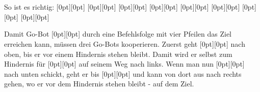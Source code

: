 {{\section*{\BrochureSolution}
So ist es richtig:
\raisebox{-0.5ex}[0pt][0pt]{} \raisebox{-0.5ex}[0pt][0pt]{}  \raisebox{-0.5ex}[0pt][0pt]{} \raisebox{-0.5ex}[0pt][0pt]{}  \raisebox{-0.5ex}[0pt][0pt]{} \raisebox{-0.5ex}[0pt][0pt]{}  \raisebox{-0.5ex}[0pt][0pt]{} \raisebox{-0.5ex}[0pt][0pt]{}

Damit Go-Bot \raisebox{-0.5ex}[0pt][0pt]{} durch eine Befehlsfolge mit vier Pfeilen das Ziel erreichen kann, müssen drei Go-Bots kooperieren.
Zuerst geht \raisebox{-0.5ex}[0pt][0pt]{} nach oben, bis er vor einem Hindernis stehen bleibt.
Damit wird er selbst zum Hindernis für \raisebox{-0.5ex}[0pt][0pt]{} auf seinem Weg nach links.
Wenn man nun \raisebox{-0.5ex}[0pt][0pt]{} nach unten schickt, geht er bis \raisebox{-0.5ex}[0pt][0pt]{} und kann von dort aus nach rechts gehen,
wo er vor dem Hindernis stehen bleibt - auf dem Ziel.

{\centering%
\par}

}}
